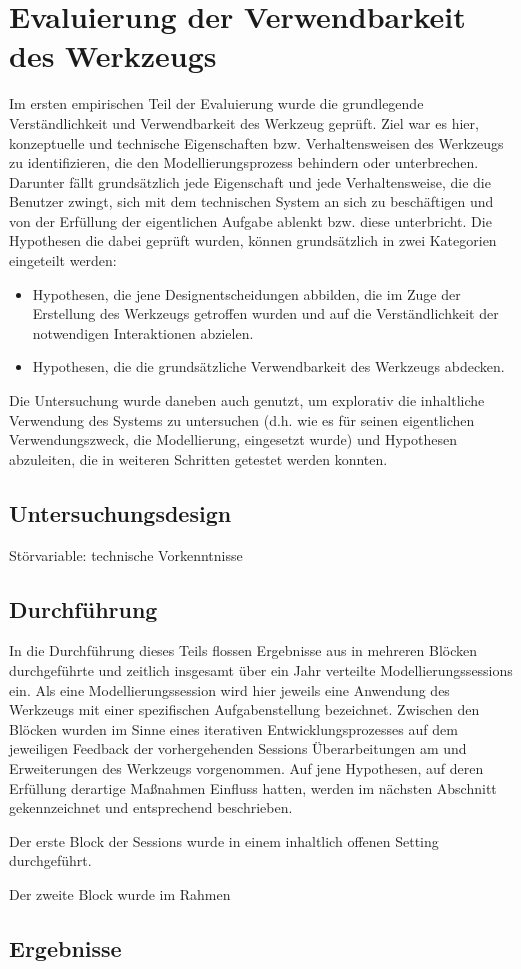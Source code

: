 \chapter{Evaluierung der Verwendbarkeit des Werkzeugs} %
\label{cha:eval_tui}

Im ersten empirischen Teil der Evaluierung wurde die grundlegende Verständlichkeit und Verwendbarkeit des Werkzeug geprüft. Ziel war es hier, konzeptuelle und technische Eigenschaften bzw. Verhaltensweisen des Werkzeugs zu identifizieren, die den Modellierungsprozess behindern oder unterbrechen. Darunter fällt grundsätzlich jede Eigenschaft und jede Verhaltensweise, die die Benutzer zwingt, sich mit dem technischen System an sich zu beschäftigen und von der Erfüllung der eigentlichen Aufgabe ablenkt bzw. diese unterbricht. Die Hypothesen die dabei geprüft wurden, können grundsätzlich in zwei Kategorien eingeteilt werden:
\begin{itemize}
 \item Hypothesen, die jene Designentscheidungen abbilden, die im Zuge der Erstellung des Werkzeugs getroffen wurden und auf die Verständlichkeit der notwendigen Interaktionen abzielen.
 \item Hypothesen, die die grundsätzliche Verwendbarkeit des Werkzeugs abdecken.
\end{itemize}

Die Untersuchung wurde daneben auch genutzt, um explorativ die inhaltliche Verwendung des Systems zu untersuchen (d.h. wie es für seinen eigentlichen Verwendungszweck, die Modellierung, eingesetzt wurde) und Hypothesen abzuleiten, die in weiteren Schritten getestet werden konnten.

\section{Untersuchungsdesign}

Störvariable: technische Vorkenntnisse 

\section{Durchführung}

In die Durchführung dieses Teils flossen Ergebnisse aus in mehreren Blöcken durchgeführte und zeitlich insgesamt über ein Jahr verteilte Modellierungssessions ein. Als eine Modellierungssession wird hier jeweils eine Anwendung des Werkzeugs mit einer spezifischen Aufgabenstellung bezeichnet. Zwischen den Blöcken wurden im Sinne eines iterativen Entwicklungsprozesses auf dem jeweiligen Feedback der vorhergehenden Sessions Überarbeitungen am und Erweiterungen des Werkzeugs vorgenommen. Auf jene Hypothesen, auf deren Erfüllung derartige Maßnahmen Einfluss hatten, werden im nächsten Abschnitt gekennzeichnet und entsprechend beschrieben.

Der erste Block der Sessions wurde in einem inhaltlich offenen Setting durchgeführt.

Der zweite Block wurde im Rahmen 

\section{Ergebnisse}


